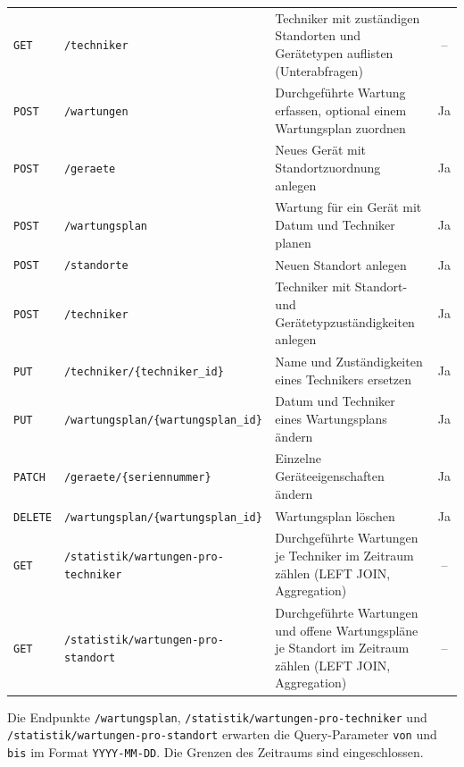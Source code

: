 \documentclass[11pt,a4paper]{article}
\begin{document}
\begin{tabularx}{\linewidth}{
    @{}
    l
    >{\raggedright\arraybackslash}p{5.8cm}
    >{\raggedright\arraybackslash}X
    c
    @{}
}
\texttt{GET}
& \nolinkurl{/techniker}
& Techniker mit zuständigen Standorten und Gerätetypen auflisten (Unterabfragen)
& -- \\

\texttt{POST}
& \nolinkurl{/wartungen}
& Durchgeführte Wartung erfassen, optional einem Wartungsplan zuordnen
& Ja \\

\texttt{POST}
& \nolinkurl{/geraete}
& Neues Gerät mit Standortzuordnung anlegen
& Ja \\

\texttt{POST}
& \nolinkurl{/wartungsplan}
& Wartung für ein Gerät mit Datum und Techniker planen
& Ja \\

\texttt{POST}
& \nolinkurl{/standorte}
& Neuen Standort anlegen
& Ja \\

\texttt{POST}
& \nolinkurl{/techniker}
& Techniker mit Standort- und Gerätetypzuständigkeiten anlegen
& Ja \\

\texttt{PUT}
& \nolinkurl{/techniker/{techniker_id}}
& Name und Zuständigkeiten eines Technikers ersetzen
& Ja \\

\texttt{PUT}
& \nolinkurl{/wartungsplan/{wartungsplan_id}}
& Datum und Techniker eines Wartungsplans ändern
& Ja \\

\texttt{PATCH}
& \nolinkurl{/geraete/{seriennummer}}
& Einzelne Geräteeigenschaften ändern
& Ja \\

\texttt{DELETE}
& \nolinkurl{/wartungsplan/{wartungsplan_id}}
& Wartungsplan löschen
& Ja \\

\texttt{GET}
& \nolinkurl{/statistik/wartungen-pro-techniker}
& Durchgeführte Wartungen je Techniker im Zeitraum zählen (LEFT JOIN, Aggregation)
& -- \\

\texttt{GET}
& \nolinkurl{/statistik/wartungen-pro-standort}
& Durchgeführte Wartungen und offene Wartungspläne je Standort im Zeitraum zählen (LEFT JOIN, Aggregation)
& -- \\

\bottomrule
\end{tabularx}

\medskip
\noindent
Die Endpunkte \nolinkurl{/wartungsplan},
\nolinkurl{/statistik/wartungen-pro-techniker} und
\nolinkurl{/statistik/wartungen-pro-standort}
erwarten die Query-Parameter \texttt{von} und \texttt{bis}
im Format \texttt{YYYY-MM-DD}.
Die Grenzen des Zeitraums sind eingeschlossen.
\end{document}
